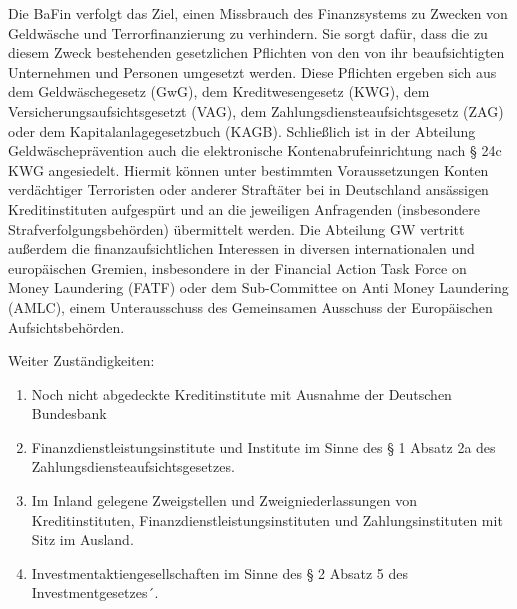 \documentclass{article}
\begin{document}
\begin{enumerate}
                    Die BaFin verfolgt das Ziel, einen Missbrauch des Finanzsystems zu Zwecken von Geldwäsche und Terrorfinanzierung zu verhindern. Sie sorgt dafür, dass die zu diesem Zweck bestehenden gesetzlichen Pflichten von den von ihr beaufsichtigten Unternehmen und Personen umgesetzt werden. Diese Pflichten ergeben sich aus dem Geldwäschegesetz (GwG), dem Kreditwesengesetz (KWG), dem Versicherungsaufsichtsgesetzt (VAG), dem Zahlungsdiensteaufsichtsgesetz (ZAG) oder dem Kapitalanlagegesetzbuch (KAGB). Schließlich ist in der Abteilung Geldwäscheprävention auch die elektronische Kontenabrufeinrichtung nach § 24c KWG angesiedelt. Hiermit können unter bestimmten Voraussetzungen Konten verdächtiger Terroristen oder anderer Straftäter bei in Deutschland ansässigen Kreditinstituten aufgespürt und an die jeweiligen Anfragenden (insbesondere Strafverfolgungsbehörden) übermittelt werden. Die Abteilung GW vertritt außerdem die finanzaufsichtlichen Interessen in diversen internationalen und europäischen Gremien, insbesondere in der Financial Action Task Force on Money Laundering (FATF) oder dem Sub-Committee on Anti Money Laundering (AMLC), einem Unterausschuss des Gemeinsamen Ausschuss der Europäischen Aufsichtsbehörden.
                   
                    Weiter Zuständigkeiten: 
                    \begin{enumerate}
                        \item
                            
                            Noch nicht abgedeckte Kreditinstitute mit Ausnahme der Deutschen Bundesbank

                        \item

                            Finanzdienstleistungsinstitute und Institute im Sinne des § 1 Absatz
                            2a des Zahlungsdiensteaufsichtsgesetzes.

                        \item

                            Im Inland gelegene Zweigstellen und Zweigniederlassungen von
                            Kreditinstituten, Finanzdienstleistungsinstituten und
                            Zahlungsinstituten mit Sitz im Ausland.

                        \item

                            Investmentaktiengesellschaften im Sinne des § 2 Absatz 5 des
                            Investmentgesetzes´.


\end{enumerate}
\end{enumerate}
\end{document}
